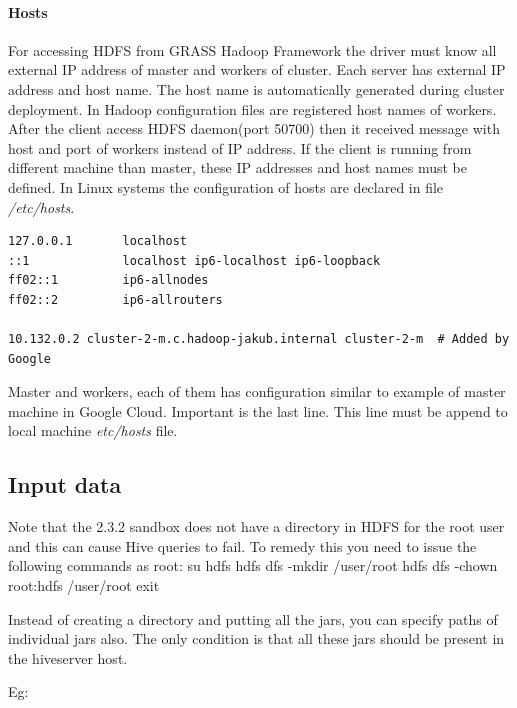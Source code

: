 \documentclass[a4paper,12pt,oneside]{report}
\begin{document}
	\paragraph{Hosts} For accessing HDFS from GRASS Hadoop Framework the driver must
	know all external IP address of master and workers of cluster. Each server has
	external IP address and host name. The host name is automatically generated
	during cluster deployment. In Hadoop configuration files are registered host
	names of workers. After the client access HDFS daemon(port 50700) then it received
	message with host and port of workers instead of IP address. If the client is
	running from different machine than master, these IP addresses and host names
	must be defined. In Linux systems the configuration of hosts  are declared in
	file \textit{/etc/hosts}. 
	\begin{footnotesize}
		\begin{lstlisting}[style=python]
127.0.0.1       localhost
::1             localhost ip6-localhost ip6-loopback
ff02::1         ip6-allnodes
ff02::2         ip6-allrouters

10.132.0.2 cluster-2-m.c.hadoop-jakub.internal cluster-2-m  # Added by Google
		\end{lstlisting}
	\end{footnotesize}
	Master and workers, each of them has configuration similar to example of master
	machine in Google Cloud. Important is the  last line. This line must be append to local
	machine \textit{etc/hosts} file.
	\begin{flushright}
		
	\end{flushright}
	
	\subsection{Input data}
	Note that the 2.3.2 sandbox does not have a directory in HDFS for the root user
	and this can cause Hive queries to fail. To remedy this you need to issue the
	following commands as root:
	su hdfs
	hdfs dfs -mkdir /user/root
	hdfs dfs -chown root:hdfs /user/root
	exit
	
	
	
	
	
	Instead of creating a directory and putting all the jars, you can specify paths
	of individual jars also. The only condition is that all these jars should be
	present in the hiveserver host.
	
	Eg:
	
\end{document}
